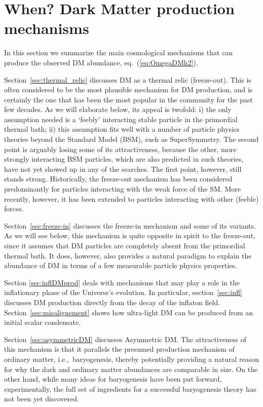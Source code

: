 
\chapter{When? Dark Matter production mechanisms}\label{chapter:production}
In this section we summarize the main cosmological mechanisms that can produce the observed DM abundance, eq.~(\ref{eq:OmegaDMh2}).

Section~\ref{sec:thermal_relic} discusses DM as a thermal relic (freeze-out). 
This is often considered to be the most plausible mechanism for DM production, and is certainly the one that has been the most popular in the community for the past few decades. 
As we will elaborate below, its appeal is twofold: 
i) the only assumption needed is a `feebly' interacting stable particle in the primordial thermal bath;
ii) this assumption fits well with a number of particle physics theories beyond the Standard Model (BSM),
such as SuperSymmetry. The second point is arguably losing some of its attractiveness, because the other, more strongly interacting BSM particles, which are also predicted in such theories, have not yet showed up in any of the searches. The first point, however, still stands strong. 
Historically, the freeze-out mechanism has been considered predominantly for particles interacting with the weak force of the SM. More recently, however, it has been extended to particles interacting with other (feeble) forces.

Section~\ref{sec:freeze-in} discusses the freeze-in mechanism and some of its variants. As we will see below, this mechanism is quite opposite in spirit to the freeze-out, since it assumes that DM particles are completely absent from the primordial thermal bath. It does, however, also provides a natural paradigm to explain the abundance of DM in terms of a few measurable particle physics properties.

Section \ref{sec:inflDMprod} deals with mechanisms that may play a role in the inflationary phase of the Universe's evolution.
In particular, section~\ref{sec:infl} discusses DM production directly from the decay of the inflaton field. 
Section~\ref{sec:misalignement} shows how ultra-light DM can be produced from an initial scalar condensate.

Section~\ref{sec:asymmetricDM} discusses Asymmetric DM. The attractiveness of this mechanism is that it parallels the presumed production mechanism of ordinary matter, i.e.,~baryogenesis, thereby potentially providing a natural reason for why the dark and ordinary matter abundances are comparable in size. On the other hand, while many ideas for baryogenesis have been put forward, experimentally, the full set of ingredients for a successful baryogenesis theory has not been yet discovered.

